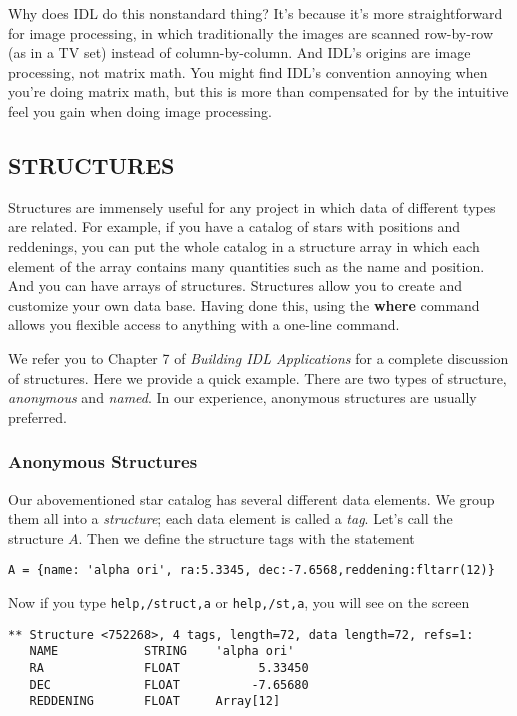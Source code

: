 \documentclass[psfig,preprint]{aastex}
\begin{document}
          Why does IDL do this nonstandard thing? It's because it's more
straightforward for image processing, in which traditionally the images
are scanned row-by-row (as in a TV set) instead of column-by-column. And
IDL's origins are image processing, not matrix math. You might find
IDL's convention annoying when you're doing matrix math, but this is
more than compensated for by the intuitive feel you gain when doing
image processing.

\subsection{ STRUCTURES}

	Structures are immensely useful for any project in which data of
different types are related.  For example, if you have a catalog of
stars with positions and reddenings, you can put the whole catalog in a
structure array in which each element of the array contains many
quantities such as the name and position.  And you can have arrays of
structures.  Structures allow you to create and customize your own data
base. Having done this, using the {\bf where} command allows you
flexible access to anything with a one-line command.

We refer you to Chapter 7 of {\it Building IDL Applications} for
a complete discussion of structures.  Here we provide a quick
example. There are two types of structure, {\it anonymous} and {\it
  named}. In our experience, anonymous structures are usually preferred.

\subsubsection{Anonymous Structures}

Our abovementioned star catalog has several different data elements. We
group them all into a {\it structure}; each data element is called a
{\it tag}. Let's call the structure $A$. Then we define the structure
tags with the statement

\begin{verbatim}
A = {name: 'alpha ori', ra:5.3345, dec:-7.6568,reddening:fltarr(12)}
\end{verbatim}

\noindent Now if you type {\tt help,/struct,a} or {\tt help,/st,a}, you
will see on the screen

\begin{verbatim}
** Structure <752268>, 4 tags, length=72, data length=72, refs=1:
   NAME            STRING    'alpha ori'
   RA              FLOAT           5.33450
   DEC             FLOAT          -7.65680
   REDDENING       FLOAT     Array[12]
\end{verbatim}
\end{document}
